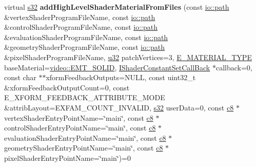 \begin{DoxyCompactItemize}
\item 
virtual \hyperlink{namespaceirr_ac66849b7a6ed16e30ebede579f9b47c6}{s32} {\bfseries add\+High\+Level\+Shader\+Material\+From\+Files} (const \hyperlink{namespaceirr_1_1io_ab1bdc45edb3f94d8319c02bc0f840ee1}{io\+::path} \&vertex\+Shader\+Program\+File\+Name, const \hyperlink{namespaceirr_1_1io_ab1bdc45edb3f94d8319c02bc0f840ee1}{io\+::path} \&control\+Shader\+Program\+File\+Name, const \hyperlink{namespaceirr_1_1io_ab1bdc45edb3f94d8319c02bc0f840ee1}{io\+::path} \&evaluation\+Shader\+Program\+File\+Name, const \hyperlink{namespaceirr_1_1io_ab1bdc45edb3f94d8319c02bc0f840ee1}{io\+::path} \&geometry\+Shader\+Program\+File\+Name, const \hyperlink{namespaceirr_1_1io_ab1bdc45edb3f94d8319c02bc0f840ee1}{io\+::path} \&pixel\+Shader\+Program\+File\+Name, \hyperlink{namespaceirr_a0416a53257075833e7002efd0a18e804}{u32} patch\+Vertices=3, \hyperlink{namespaceirr_1_1video_ac8e9b6c66f7cebabd1a6d30cbc5430f1}{E\+\_\+\+M\+A\+T\+E\+R\+I\+A\+L\+\_\+\+T\+Y\+PE} base\+Material=\hyperlink{namespaceirr_1_1video_ac8e9b6c66f7cebabd1a6d30cbc5430f1a9bc471b9c18c9e2d20496004d2a2e803}{video\+::\+E\+M\+T\+\_\+\+S\+O\+L\+ID}, \hyperlink{classirr_1_1video_1_1IShaderConstantSetCallBack}{I\+Shader\+Constant\+Set\+Call\+Back} $\ast$callback=0, const char $\ast$$\ast$xform\+Feedback\+Outputs=N\+U\+LL, const uint32\+\_\+t \&xform\+Feedback\+Output\+Count=0, const E\+\_\+\+X\+F\+O\+R\+M\+\_\+\+F\+E\+E\+D\+B\+A\+C\+K\+\_\+\+A\+T\+T\+R\+I\+B\+U\+T\+E\+\_\+\+M\+O\+DE \&attrib\+Layout=E\+X\+F\+A\+M\+\_\+\+C\+O\+U\+N\+T\+\_\+\+I\+N\+V\+A\+L\+ID, \hyperlink{namespaceirr_ac66849b7a6ed16e30ebede579f9b47c6}{s32} user\+Data=0, const \hyperlink{namespaceirr_a9395eaea339bcb546b319e9c96bf7410}{c8} $\ast$vertex\+Shader\+Entry\+Point\+Name=\char`\"{}main\char`\"{}, const \hyperlink{namespaceirr_a9395eaea339bcb546b319e9c96bf7410}{c8} $\ast$control\+Shader\+Entry\+Point\+Name=\char`\"{}main\char`\"{}, const \hyperlink{namespaceirr_a9395eaea339bcb546b319e9c96bf7410}{c8} $\ast$evaluation\+Shader\+Entry\+Point\+Name=\char`\"{}main\char`\"{}, const \hyperlink{namespaceirr_a9395eaea339bcb546b319e9c96bf7410}{c8} $\ast$geometry\+Shader\+Entry\+Point\+Name=\char`\"{}main\char`\"{}, const \hyperlink{namespaceirr_a9395eaea339bcb546b319e9c96bf7410}{c8} $\ast$pixel\+Shader\+Entry\+Point\+Name=\char`\"{}main\char`\"{})=0\hypertarget{classirr_1_1video_1_1IGPUProgrammingServices_af6b1c2199e34129624e017773d110054}{}\label{classirr_1_1video_1_1IGPUProgrammingServices_af6b1c2199e34129624e017773d110054}


\end{DoxyCompactItemize}
